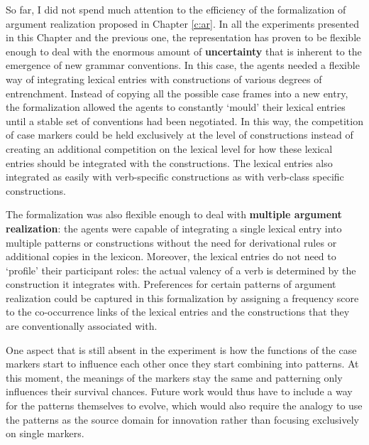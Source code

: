 So far, I did not spend much attention to the efficiency of the formalization of argument realization proposed in Chapter \ref{c:ar}. In all the experiments presented in this Chapter and the previous one, the representation has proven to be flexible enough to deal with the enormous amount of {\bfseries uncertainty} that is inherent to the emergence of new grammar conventions. In this case, the agents needed a flexible way of integrating lexical entries with constructions of various degrees of entrenchment. Instead of copying all the possible case frames into a new entry, the formalization allowed the agents to constantly `mould' their lexical entries until a stable set of conventions had been negotiated. In this way, the competition of case markers could be held exclusively at the level of constructions instead of creating an additional competition on the lexical level for how these lexical entries should be integrated with the constructions. The lexical entries also integrated as easily with verb-specific constructions as with verb-class specific constructions.

The formalization was also flexible enough to deal with {\bfseries multiple argument realization}: the agents were capable of integrating a single lexical entry into multiple patterns or constructions without the need for derivational rules or additional copies in the lexicon. Moreover, the lexical entries do not need to `profile' their participant roles: the actual valency of a verb is determined by the construction it integrates with. Preferences for certain patterns of argument realization could be captured in this formalization by assigning a frequency score to the co-occurrence links of the lexical entries and the constructions that they are conventionally associated with.

One aspect that is still absent in the experiment is how the functions of the case markers start to influence each other once they start combining into patterns. At this moment, the meanings of the markers stay the same and patterning only influences their survival chances. Future work would thus have to include a way for the patterns themselves to evolve, which would also require the analogy to use the patterns as the source domain for innovation rather than focusing exclusively on single markers.

